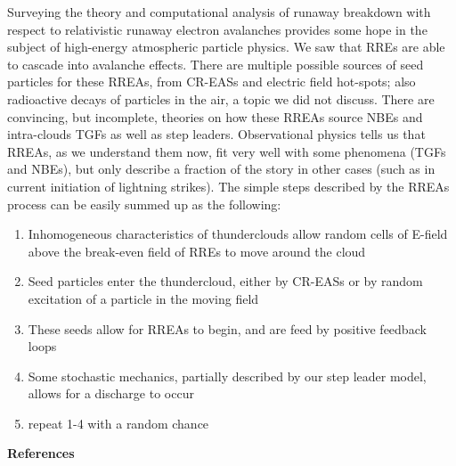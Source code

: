 \documentclass[11pt]{article}
\begin{document}
\begin{multicols*}{2}
    Surveying the theory and computational analysis of runaway breakdown with respect to relativistic runaway electron avalanches provides some hope in the subject of high-energy atmospheric particle physics. We saw that RREs are able to cascade into avalanche effects. There are multiple possible sources of seed particles for these RREAs, from CR-EASs and electric field hot-spots; also radioactive decays of particles in the air, a topic we did not discuss. There are convincing, but incomplete, theories on how these RREAs source NBEs and intra-clouds TGFs as well as step leaders. Observational physics tells us that RREAs, as we understand them now, fit very well with some phenomena (TGFs and NBEs), but only describe a fraction of the story in other cases (such as in current initiation of lightning strikes). The simple steps described by the RREAs process can be easily summed up as the following:
    \begin{enumerate}
        \item Inhomogeneous characteristics of thunderclouds allow random cells of E-field above the break-even field of RREs to move around the cloud
        \item Seed particles enter the thundercloud, either by CR-EASs or by random excitation of a particle in the moving field
        \item These seeds allow for RREAs to begin, and are feed by positive feedback loops
        \item Some stochastic mechanics, partially described by our step leader model, allows for a discharge to occur
        \item repeat 1-4 with a random chance
    \end{enumerate}
    



\end{multicols*}


    \newpage
    \noindent
{\bf \LARGE References}\\
\setlength{\parskip}{0em}
\end{document}
